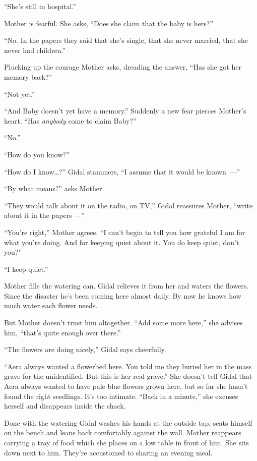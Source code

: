 \documentclass[twoside,11pt,openany]{book}
\begin{document}
``She's still in hospital.''

Mother is fearful.  She asks, ``Does she claim{ }that the baby is hers?''

``No. In the papers they said that she's single, that she never married, that she never had
children.''

Plucking up the courage Mother asks, dreading the answer,
``Has she got her memory back?''

``Not yet.''

``And Baby doesn't yet have a memory.'' Suddenly a new fear pierces Mother's heart.
``Has \textit{anybody }come to claim Baby?''

``No.''

``How do you know?''

``How do I know{\ldots}?'' Gidal stammers, ``I assume that it would be
\hbox{known ---''}

``By what means?'' asks Mother.

``They would talk about it on the radio, on TV,'' Gidal reassures Mother, ``write
 about it in the papers ---''

``You're right,'' Mother agrees. ``I can't begin to tell you how grateful I am
for what you're doing. And for keeping quiet about it. You do keep quiet, don't you?''

``I keep quiet.''

Mother fills the watering can.  Gidal relieves it from her and waters the flowers. Since the disaster he's been coming
here almost daily. By now he knows how much water each flower needs.

But Mother doesn't trust him altogether. ``Add some more here,'' she advises him,
``that's quite enough over there.''

``The flowers are doing nicely,'' Gidal says cheerfully.

``Aera always wanted a flowerbed here. You told me they buried her in the mass grave for the unidentified.
But this is her real grave.'' She doesn't tell Gidal that Aera always wanted to have pale blue flowers
grown here, but so far she hasn't found the right seedlings. It's too intimate. ``Back in a
minute,'' she excuses herself and disappears inside the shack.

Done with the watering Gidal washes his hands at the outside tap, seats himself on the bench and leans back
comfortably against the wall. Mother reappears carrying a tray of food which she places on a low table in front of him.
She sits down next to him. They're accustomed to sharing an evening meal.
\end{document}
